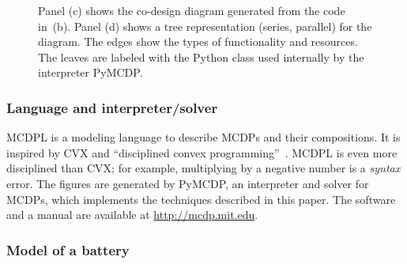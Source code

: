 \begin{figure}
\begin{centering}
{}\medskip{}
\par\end{centering}
\begin{centering}
\par\end{centering}
\medskip{}

\medskip{}

\caption{Panel (c) shows the co-design diagram generated from the code in~(b).
Panel (d) shows a tree representation (series, parallel) for the diagram.
The edges show the types of functionality and resources. The leaves
are labeled with the Python class used internally by the interpreter
PyMCDP. }
\end{figure}


\subsubsection{Language and interpreter/solver}

MCDPL is a modeling language to describe MCDPs and their compositions.
It is inspired by CVX and ``disciplined convex programming''~\cite{grant08graph}.
MCDPL is even more disciplined than CVX; for example, multiplying
by a negative number is a \emph{syntax} error. The figures are generated
by PyMCDP, an interpreter and solver for MCDPs, which implements the
techniques described in this paper.  The software and a manual are
available at \url{http://mcdp.mit.edu}.

\subsubsection{Model of a battery}

